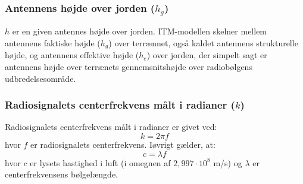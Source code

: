 \subsubsection{Antennens højde over jorden ($h_g$)}
$h$ er en given antennes højde over jorden. ITM-modellen skelner mellem antennens faktiske højde ($h_g$) over terrænnet, også kaldet antennens strukturelle højde, og antennens effektive højde ($h_e$) over jorden, der simpelt sagt er antennens højde over terrænets gennemsnitshøjde over radiobølgens udbredelsesområde. 

\subsubsection{Radiosignalets centerfrekvens målt i radianer ($k$)}
Radiosignalets centerfrekvens målt i radianer er givet ved:
\begin{equation}
k = 2 \pi f
\end{equation}
hvor $f$ er radiosignalets centerfrekvens. Iøvrigt gælder, at:
\begin{equation}
c = \lambda f
\end{equation}
hvor $c$ er lysets hastighed i luft (i omegnen af $2,997 \cdot 10^8$ m/s) og $\lambda$ er centerfrekvensens bølgelængde.

